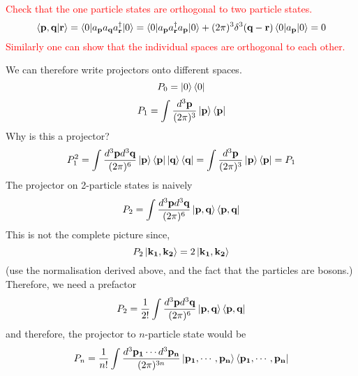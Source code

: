\documentclass[11pt, notitlepage]{report}
\renewcommand{\a}[1]{a_\mathbf{#1}}
\newcommand{\adag}[1]{a^\dagger_\mathbf{#1}}
\numberwithin{equation}{section}
\begin{document}
    \textcolor{red}{
        Check that the one particle states are orthogonal to two particle states.
        \begin{equation*}
            \braket{\textbf{p}, \textbf{q} | \textbf{r}} = \braket{0| \a{p}\a{q}\adag{r}|0} = \braket{0|\a{p}\adag{r}\a{p}|0} + (2\pi)^3\delta^3(\textbf{q} - \textbf{r})\braket{0|\a{p}|0} = 0
        \end{equation*}
        Similarly one can show that the individual spaces are orthogonal to each other.\\
    }

    We can therefore write projectors onto different spaces. 
    \begin{equation*}
        P_0 = \ket{0}\bra{0}
    \end{equation*}
    \begin{equation*}
        P_1 = \int  \frac{d^3\textbf{p}}{(2\pi)^3} \ket{\textbf{p}}\bra{\textbf{p}}
    \end{equation*}
    Why is this a projector? \\
    \begin{equation*}
        P_1^2 = \int  \frac{d^3\textbf{p}d^3\textbf{q}}{(2\pi)^6} \ket{\textbf{p}}\bra{\textbf{p}} \ket{\textbf{q}}\bra{\textbf{q}} = \int  \frac{d^3\textbf{p}}{(2\pi)^3} \ket{\textbf{p}}\bra{\textbf{p}} = P_1
    \end{equation*}
    The projector on 2-particle states is naively
    \begin{equation*}
        P_2 = \int  \frac{d^3\textbf{p}d^3\textbf{q}}{(2\pi)^6} \ket{\textbf{p}, \textbf{q}}\bra{\textbf{p}, \textbf{q}} 
    \end{equation*}
    This is not the complete picture since, 
    \begin{equation*}
        P_2 \ket{\mathbf{k_1}, \mathbf{k_2}} = 2\ket{\mathbf{k_1}, \mathbf{k_2}}
    \end{equation*}
    (use the normalisation derived above, and the fact that the particles are bosons.)\\
    Therefore, we need a prefactor 
    \begin{equation*}
        P_2 = \frac{1}{2!}\int  \frac{d^3\textbf{p}d^3\textbf{q}}{(2\pi)^6} \ket{\textbf{p}, \textbf{q}}\bra{\textbf{p}, \textbf{q}} 
    \end{equation*}
    and therefore, the projector to \(n\)-particle state would be 
    \begin{equation*}
        P_n = \frac{1}{n!}\int  \frac{d^3\mathbf{p_1}\cdots d^3\mathbf{p_n}}{(2\pi)^{3n}} \ket{\mathbf{p_1},\cdots, \mathbf{p_n}}\bra{\mathbf{p_1},\cdots, \mathbf{p_n}} 
    \end{equation*}
\end{document}
